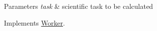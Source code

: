 \begin{DoxyParams}{Parameters}
{\em task} & scientific task to be calculated \\
\hline
\end{DoxyParams}


Implements \hyperlink{a00040_a78d4ec19f0ec658782263b3f64001f39}{Worker}.

